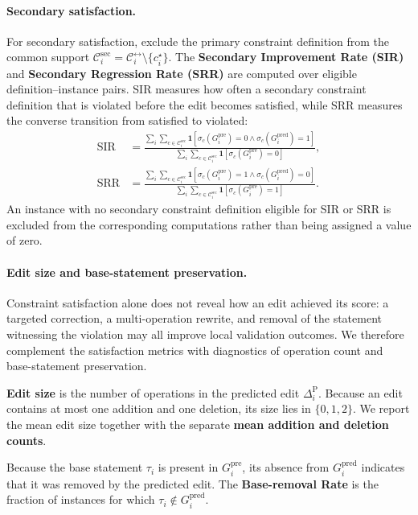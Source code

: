 \documentclass[a4paper,UKenglish,cleveref,autoref,thm-restate]{tgdk-v2021}
\newcommand{\sir}{\mathrm{SIR}}
\newcommand{\srr}{\mathrm{SRR}}
\newcommand{\Gpre}{G_i^{\mathrm{pre}}}
\newcommand{\Gpred}{G_i^{\mathrm{pred}}}
\newcommand{\prededit}{\Delta^{\mathrm{P}}}
\begin{document}
\paragraph*{Secondary satisfaction.}
For secondary satisfaction, exclude the primary constraint definition from the common support \(\mathcal{C}_i^{\mathrm{sec}} =\mathcal{C}_i^{\leftrightarrow}\setminus\{c_i^\star\}.\)
The \textbf{Secondary Improvement Rate (SIR)} and \textbf{Secondary Regression Rate (SRR)} are computed over eligible definition--instance pairs. SIR measures how often a secondary constraint definition that is violated before the edit becomes satisfied, while SRR measures the converse transition from satisfied to violated:
\[
\begin{aligned}
\sir
&=\frac{\sum_i\sum_{c\in\mathcal{C}_i^{\mathrm{sec}}}
\mathbf{1}[\sigma_c(\Gpre)=0\land \sigma_c(\Gpred)=1]}
{\sum_i\sum_{c\in\mathcal{C}_i^{\mathrm{sec}}}\mathbf{1}[\sigma_c(\Gpre)=0]},\\
\srr
&=\frac{\sum_i\sum_{c\in\mathcal{C}_i^{\mathrm{sec}}}
\mathbf{1}[\sigma_c(\Gpre)=1\land \sigma_c(\Gpred)=0]}
{\sum_i\sum_{c\in\mathcal{C}_i^{\mathrm{sec}}}\mathbf{1}[\sigma_c(\Gpre)=1]}.
\end{aligned}
\]
An instance with no secondary constraint definition eligible for SIR or SRR is excluded from the corresponding computations rather than being assigned a value of zero.

\paragraph*{Edit size and base-statement preservation.}
Constraint satisfaction alone does not reveal how an edit achieved its score: a targeted correction, a multi-operation rewrite, and removal of the statement witnessing the violation may all improve local validation outcomes. We therefore complement the satisfaction metrics with diagnostics of operation count and base-statement preservation.

\textbf{Edit size} is the number of operations in the predicted edit \(\prededit_i\). Because an edit contains at most one addition and one deletion, its size lies in \(\{0,1,2\}\). We report the mean edit size together with the separate \textbf{mean addition and deletion counts}.

Because the base statement \(\tau_i\) is present in \(\Gpre\), its absence from \(\Gpred\) indicates that it was removed by the predicted edit. The \textbf{Base-removal Rate} is the fraction of instances for which \(\tau_i\notin\Gpred\).
\end{document}
